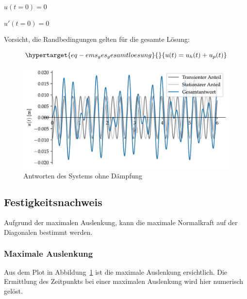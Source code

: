 \documentclass[
  letterpaper,
  DIV=11]{scrreprt}
\begin{document}
\(u(t=0)=0\)

\(u'(t=0)=0\)

Vorsicht, die Randbedingungen gelten für die gesamte Lösung:

\begin{equation}\protect\hypertarget{eq-ems_ges_gesamtloesung}{}{
u(t) = u_h(t) + u_p(t)
}\label{eq-ems_ges_gesamtloesung}\end{equation}

\begin{figure}[H]

{\centering \includegraphics{index_files/mediabag/ems_04_files/figure-pdf/fig-ems_ges_gesamtantwort_ems4-output-1.pdf}

}

\caption{\label{fig-ems_ges_gesamtantwort_ems4}Antworten des Systems
ohne Dämpfung}

\end{figure}

\hypertarget{festigkeitsnachweis}{%
\subsection{Festigkeitsnachweis}\label{festigkeitsnachweis}}

Aufgrund der maximalen Auslenkung, kann die maximale Normalkraft auf der
Diagonalen bestimmt werden.

\hypertarget{maximale-auslenkung}{%
\subsubsection{Maximale Auslenkung}\label{maximale-auslenkung}}

Aus dem Plot in Abbildung~\ref{fig-ems_ges_gesamtantwort_ems4} ist die
maximale Auslenkung ersichtlich. Die Ermittlung des Zeitpunkts bei einer
maximalen Auslenkung wird hier numerisch gelöst.
\end{document}
